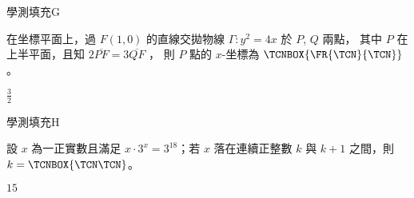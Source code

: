     \begin{QUESTION}
        \begin{ExamInfo}{94}{學測}{填充}{G}
        \end{ExamInfo}
        \begin{ExamAnsRateInfo}{12}{24}{8}{4}
        \end{ExamAnsRateInfo}
        \begin{QBODY}
            在坐標平面上，過 $F(1,0)$ 的直線交拋物線 $\Gamma : y^2 = 4x$ 於 $P$, $Q$ 兩點，
			其中 $P$ 在上半平面，且知 $2\overline{PF} = 3\overline{QF}$ ，
			則 $P$ 點的 $x$-坐標為 
			$\TCNBOX{\FR{\TCN}{\TCN}}$。
        \end{QBODY}
        \begin{QFROMS}
        \end{QFROMS}
        \begin{QTAGS}\end{QTAGS}
        \begin{QANS}
            $\frac{3}{2}$
        \end{QANS}
        \begin{QSOLLIST}
        \end{QSOLLIST}
        \begin{QEMPTYSPACE}
        \end{QEMPTYSPACE}
    \end{QUESTION}
    \begin{QUESTION}
        \begin{ExamInfo}{94}{學測}{填充}{H}
        \end{ExamInfo}
        \begin{ExamAnsRateInfo}{32}{66}{25}{5}
        \end{ExamAnsRateInfo}
        \begin{QBODY}
            設 $x$ 為一正實數且滿足 $x\cdot 3^x =3^{18}$；若 $x$ 落在連續正整數 $k$ 與 $k+1$ 之間，則$k= \TCNBOX{\TCN\TCN}$。
        \end{QBODY}
        \begin{QFROMS}
        \end{QFROMS}
        \begin{QTAGS}\end{QTAGS}
        \begin{QANS}
            $15$
        \end{QANS}
        \begin{QSOLLIST}
        \end{QSOLLIST}
        \begin{QEMPTYSPACE}
        \end{QEMPTYSPACE}
    \end{QUESTION}
